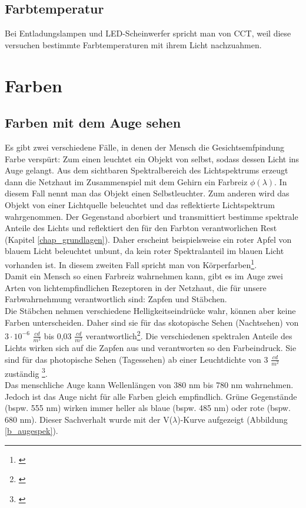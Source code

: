 \section{Farbtemperatur} \label{sec_farbtemperatur}
Bei Entladungslampen und LED-Scheinwerfer spricht man von CCT, weil diese versuchen bestimmte Farbtemperaturen mit ihrem Licht nachzuahmen.


\chapter{Farben}


\section{Farben mit dem Auge sehen} \label{sec_auge}

Es gibt zwei verschiedene Fälle, in denen der Mensch die Gesichtsemfpindung Farbe verspürt: Zum einen leuchtet ein Objekt von selbst, sodass dessen Licht ins Auge gelangt. Aus dem sichtbaren Spektralbereich des Lichtspektrums erzeugt dann die Netzhaut im Zusammenspiel mit dem Gehirn ein Farbreiz $\phi(\lambda)$. In diesem Fall nennt man das Objekt einen Selbstleuchter. Zum anderen wird das Objekt von einer Lichtquelle beleuchtet und das reflektierte Lichtspektrum wahrgenommen. Der Gegenstand aborbiert und transmittiert bestimme spektrale Anteile des Lichts und reflektiert den für den Farbton verantworlichen Rest (Kapitel \ref{chap_grundlagen}). Daher erscheint beispielsweise ein roter Apfel von blauem Licht beleuchtet unbunt, da kein roter Spektralanteil im blauen Licht vorhanden ist.
In diesem zweiten Fall spricht man von Körperfarben\footnote{\cite[103]{hentschel}}.\\     
Damit ein Mensch so einen Farbreiz wahrnehmen kann, gibt es im Auge zwei Arten von lichtempfindlichen Rezeptoren in der Netzhaut, die für unsere Farbwahrnehmung verantwortlich sind: Zapfen und Stäbchen.\\
Die Stäbchen nehmen verschiedene Helligkeitseindrücke wahr, können aber keine Farben unterscheiden. Daher sind sie für das skotopische Sehen (Nachtsehen) von $3 \cdot 10^{-6}$ $\frac{cd}{m^{2}}$ bis 0,03 $\frac{cd}{m^{2}}$ verantwortlich\footnote{\cite{doccheck sko}}.
Die verschiedenen spektralen Anteile des Lichts wirken sich auf die Zapfen aus und verantworten so den Farbeindruck. Sie sind für das photopische Sehen (Tagessehen) ab einer Leuchtdichte von 3 $\frac{cd}{m^{2}}$ zuständig \footnote{\cite{doccheck pho}}.\\
Das menschliche Auge kann Wellenlängen von 380 nm bis 780 nm wahrnehmen. Jedoch ist das Auge nicht für alle Farben gleich empfindlich. Grüne Gegenstände (bspw. 555 nm) wirken immer heller als blaue (bspw. 485 nm) oder rote (bspw. 680 nm). Dieser Sachverhalt wurde mit der V($\lambda$)-Kurve aufgezeigt (Abbildung \ref{b_augespek}).

